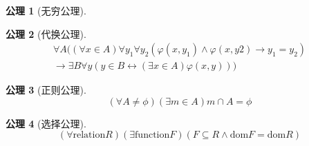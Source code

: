 \documentclass{article}
\newtheorem{Ax}{公理}
\begin{document}
\begin{CJK*}{UTF8}{gbsn}
\begin{Ax}[无穷公理]
  \end{Ax}
    \begin{Ax}[代换公理]
    \begin{equation*}
      \begin{split}
      \forall A ((\forall x \in A) \forall y_1 \forall y_2 (\varphi(x, y_1) \land \varphi(x, y2) \rightarrow y_1 = y_2)\\
      \rightarrow \exists B \forall y (y \in B \leftrightarrow (\exists x \in A) \varphi(x, y)))
    \end{split}
  \end{equation*}
  \end{Ax}
  \begin{Ax}[正则公理]
    \begin{equation*}
      (\forall A \neq \phi) (\exists m \in A) m \cap A = \phi
    \end{equation*}
  \end{Ax}
  \begin{Ax}[选择公理]
    \begin{equation*}
      (\forall \text{relation} R)
      (\exists \text{function} F)
      (F \subseteq R \land
      \text{dom} F
      = \text{dom} R)
    \end{equation*}
  \end{Ax}




\end{CJK*}
\end{document}
